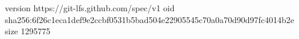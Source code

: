 version https://git-lfs.github.com/spec/v1
oid sha256:6f26c1eca1def9e2ccbf0531b5bad504e22905545c70a0a70d90d97fc4014b2e
size 1295775

